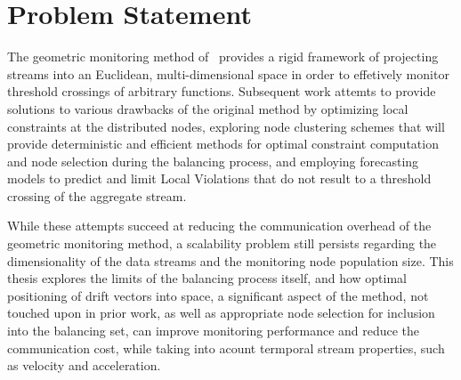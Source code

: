 \chapter{Problem Statement} \label{chap:probStatement}

The geometric monitoring method of~\cite{Sharfman2006GM} provides a rigid framework of projecting streams into an Euclidean, multi-dimensional space in order to effetively monitor threshold crossings of arbitrary functions. Subsequent work attemts to provide solutions to various drawbacks of the original method by optimizing local constraints at the distributed nodes, exploring node clustering schemes that will provide deterministic and efficient methods for optimal constraint computation and node selection during the balancing process, and employing forecasting models to predict and limit Local Violations that do not result to a threshold crossing of the aggregate stream.

While these attempts succeed at reducing the communication overhead of the geometric monitoring method, a scalability problem still persists regarding the dimensionality of the data streams and the monitoring node population size. This thesis explores the limits of the balancing process itself, and how optimal positioning of drift vectors into space, a significant aspect of the method, not touched upon in prior work, as well as appropriate node selection for inclusion into the balancing set, can improve monitoring performance and reduce the communication cost, while taking into acount termporal stream properties, such as velocity and acceleration.
